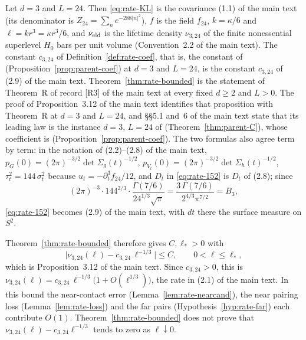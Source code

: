 \begin{remark}[$d=3$, $L=24$]\label{rem:rate-side24}
Let $d=3$ and $L=24$. Then \eqref{eq:rate-KL} is the covariance (1.1) of the main text (its denominator is $Z_{24}=\sum_ne^{-288|n|^2}$), $f$ is the field $f_{24}$, $k=\kappa/6$ and $\ell=kr^3=\kappa r^3/6$, and $\nu_{\mathrm{eld}}$ is the lifetime density $\nu_{3,24}$ of the finite nonessential superlevel $H_0$ bars per unit volume (Convention~2.2 of the main text). The constant $c_{3,24}$ of Definition~\ref{def:rate-coef}, that is, the constant of \cite[(15.2)]{parentP} (Proposition~\ref{prop:parent-coef}) at $d=3$ and $L=24$, is the constant $c_{3,24}$ of (2.9) of the main text. Theorem~\ref{thm:rate-bounded} is the statement of Theorem~R of record [R3] of the main text at every fixed $d\ge 2$ and $L>0$. The proof of Proposition~3.12 of the main text identifies that proposition with Theorem~R at $d=3$ and $L=24$, and \S\S5.1 and~6 of the main text state that its leading law is the instance $d=3$, $L=24$ of \cite[Theorem~C]{parentP} (Theorem~\ref{thm:parent-C}), whose coefficient is \cite[(15.2)]{parentP} (Proposition~\ref{prop:parent-coef}). The two formulas also agree term by term: in the notation of (2.2)--(2.8) of the main text, $p_G(0)=(2\pi)^{-3/2}\det\Sigma_g(t)^{-1/2}$, $p_{V_t}(0)=(2\pi)^{-3/2}\det\Sigma_h(t)^{-1/2}$, $\tau_t^2=144\,\sigma_t^2$ because $u_t=-\partial_t^3f_{24}/12$, and $D_t$ in \eqref{eq:rate-152} is $D_t$ of (2.8); since
\[
(2\pi)^{-3}\cdot144^{2/3}\cdot\frac{\Gamma(7/6)}{24^{1/3}\sqrt\pi}=\frac{3\,\Gamma(7/6)}{2^{4/3}\pi^{7/2}}=B_3,
\]
\eqref{eq:rate-152} becomes (2.9) of the main text, with $dt$ there the surface measure on $S^2$.

Theorem~\ref{thm:rate-bounded} therefore gives $C,\ell_*>0$ with
\[
\bigl|\nu_{3,24}(\ell)-c_{3,24}\,\ell^{-1/3}\bigr|\le C,\qquad 0<\ell\le\ell_*,
\]
which is Proposition~3.12 of the main text. Since $c_{3,24}>0$, this is $\nu_{3,24}(\ell)=c_{3,24}\,\ell^{-1/3}\bigl(1+O(\ell^{1/3})\bigr)$, the rate in (2.1) of the main text. In this bound the near-contact error (Lemma~\ref{lem:rate-nearcand}), the near pairing loss (Lemma~\ref{lem:rate-loss}) and the far pairs (Hypothesis~\ref{hyp:rate-far}) each contribute $O(1)$. Theorem~\ref{thm:rate-bounded} does not prove that $\nu_{3,24}(\ell)-c_{3,24}\ell^{-1/3}$ tends to zero as $\ell\downarrow0$.
\end{remark}
